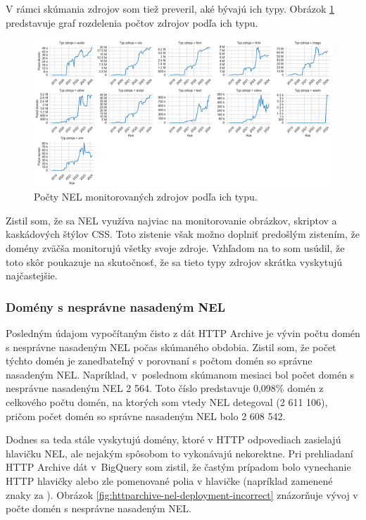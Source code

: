 V rámci skúmania zdrojov som tiež preveril, aké bývajú ich typy.
Obrázok \ref{fig:httparchive-nel-resource-types-dist} predstavuje graf rozdelenia počtov zdrojov podľa ich typu.

\begin{figure}[!htb]
\begin{center}
 \includegraphics[scale=0.447]{obrazky-figures/httparchive_nel_resource_types_dist.pdf}
 \caption{Počty NEL monitorovaných zdrojov podľa ich typu.}
 \label{fig:httparchive-nel-resource-types-dist}
\end{center}
\end{figure}

Zistil som, že sa NEL využíva najviac na monitorovanie obrázkov, skriptov a kaskádových štýlov CSS.
Toto zistenie však možno doplniť predošlým zistením, že domény zväčša monitorujú všetky svoje zdroje.
Vzhľadom na to som usúdil, že toto skôr poukazuje na skutočnosť, že sa tieto typy zdrojov skrátka vyskytujú najčastejšie.

\subsubsection{Domény s nesprávne nasadeným NEL}

Posledným údajom vypočítaným čisto z dát HTTP Archive je vývin počtu domén s nesprávne nasadeným NEL počas skúmaného obdobia.
Zistil som, že počet týchto domén je zanedbateľný v porovnaní s počtom domén so správne nasadeným NEL.
Napríklad, \mbox{v poslednom} skúmanom mesiaci bol počet domén s nesprávne nasadeným NEL 2 564. 
Toto číslo predstavuje 0,098\% domén z celkového počtu domén, na ktorých som vtedy NEL detegoval (2 611 106), pričom počet domén so správne nasadeným NEL bolo 2 608 542.

Dodnes sa teda stále vyskytujú domény, ktoré v HTTP odpovediach zasielajú hlavičku NEL, ale nejakým spôsobom to vykonávajú nekorektne.
Pri prehliadaní HTTP Archive dát \mbox{v BigQuery} som zistil, že častým prípadom bolo vynechanie HTTP hlavičky  alebo zle pomenované polia v hlavičke  (napríklad zamenené znaky  za ). 
Obrázok \ref{fig:httparchive-nel-deployment-incorrect} znázorňuje vývoj v počte domén s nesprávne nasadeným NEL.

